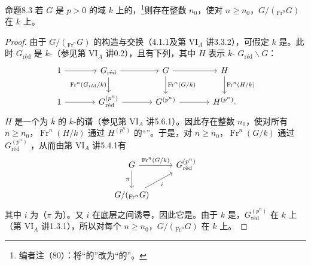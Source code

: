 \begin{SGAresult}{命题}{8.3}
若 $G$ 是 $p>0$ 的域 $k$ 上的，\footnote{编者注（80）：将“的”改为“的”。}则存在整数 $n_0$，使对 $n\ge n_0$，$G/({}_{\operatorname{Fr}^n}G)$ 在 $k$ 上。
\end{SGAresult}
\begin{proof}
由于 $G/({}_{\operatorname{Fr}^n}G)$ 的构造与交换（4.1.1及第 VI$_A$ 讲3.3.2），可假定 $k$ 是。此时 $G_{\mathrm{r\text{é}d}}$ 是 $k$-（参见第 VI$_A$ 讲0.2），且有下列，其中 $H$ 表示 $k$- $G_{\mathrm{r\text{é}d}}\backslash G$：
\[
\begin{tikzcd}[column sep=large]
 1\arrow[r]&G_{\mathrm{r\text{é}d}}\arrow[r]\arrow[d,"\operatorname{Fr}^n(G_{\mathrm{r\text{é}d}}/k)"']
 &G\arrow[r]\arrow[d,"\operatorname{Fr}^n(G/k)"]
 &H\arrow[d,"\operatorname{Fr}^n(H/k)"]\\
 1\arrow[r]&G_{\mathrm{r\text{é}d}}^{(p^n)}\arrow[r]&G^{(p^n)}\arrow[r]&H^{(p^n)}.
\end{tikzcd}
\]
$H$ 是一个为 $k$ 的 $k$-的谱（参见第 VI$_A$ 讲5.6.1）。因此存在整数 $n_0$，使对所有 $n\ge n_0$，$\operatorname{Fr}^n(H/k)$ 通过 $H^{(p^n)}$ 的“”。于是，对 $n\ge n_0$，$\operatorname{Fr}^n(G/k)$ 通过 $G_{\mathrm{r\text{é}d}}^{(p^n)}$ ，从而由第 VI$_A$ 讲5.4.1有
\[
\begin{tikzcd}
 G\arrow[r,"\operatorname{Fr}^n(G/k)"]\arrow[d,"\pi"']&G_{\mathrm{r\text{é}d}}^{(p^n)}\\
 G/({}_{\operatorname{Fr}^n}G)\arrow[ur,"i"']
\end{tikzcd}
\]
其中 $i$ 为（$\pi$ 为）。又 $i$ 在底层之间诱导，因此它是。由于 $k$ 是，$G_{\mathrm{r\text{é}d}}^{(p^n)}$ 在 $k$ 上（第 VI$_A$ 讲1.3.1），所以对每个 $n\ge n_0$，$G/({}_{\operatorname{Fr}^n}G)$ 在 $k$ 上。
\end{proof}

